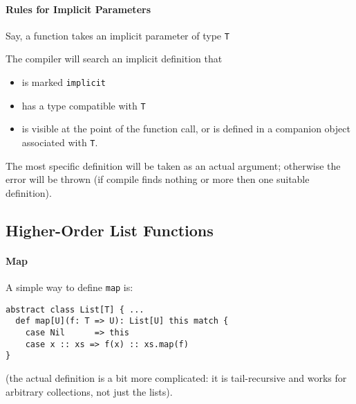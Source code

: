 \documentclass{scrartcl}
\begin{document}
\paragraph{Rules for Implicit Parameters}

Say, a function takes an implicit parameter of type \lstinline|T|

The compiler will search an implicit definition that
\begin{itemize}
\item is marked \lstinline|implicit|
\item has a type compatible with \lstinline|T|
\item is visible at the point of the function call, or is defined in a companion
  object associated with \lstinline|T|.
\end{itemize}

The most specific definition will be taken as an actual argument; otherwise the
error will be thrown (if compile finds nothing or more then one suitable
definition).

\subsection{Higher-Order List Functions}
\label{sec:HigherOrderListFunctions}

\paragraph{Map}
A simple way to define \lstinline|map| is:
\begin{lstlisting}
abstract class List[T] { ...
  def map[U](f: T => U): List[U] this match {
    case Nil      => this
    case x :: xs => f(x) :: xs.map(f)
}
\end{lstlisting}
(the actual definition is a bit more complicated: it is tail-recursive and works
for arbitrary collections, not just the lists).
\end{document}
